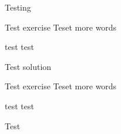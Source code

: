 \documentclass{problemset}
\begin{document}
Testing

\begin{exercise} Test exercise 
Teset
more words

test
test
\end{exercise}
\begin{solution}
Test solution
\end{solution}

\begin{exercise} Test exercise 
Teset
more words

test
test
\end{exercise}

\newpage
Test
\end{document}
